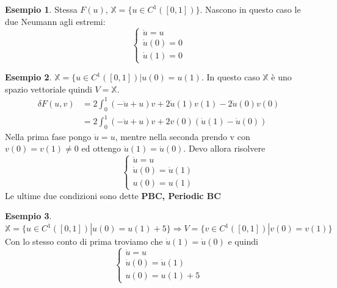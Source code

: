 \documentclass[a4paper]{book}
\theoremstyle{definition}
\newtheorem{ex}{Esempio}
\theoremstyle{remark}
\theoremstyle{definition}
\newcommand{\bbx}{\mathbb{X}}
\newcommand{\ra}{\Rightarrow}
\begin{document}
\begin{ex}
Stessa $F(u)$, $\bbx = \{ u \in C^1([0,1])\}$. Nascono in questo caso le due Neumann agli estremi:
\[
	\begin{cases}
	\ddot{u} = u\\
	\dot{u}(0) = 0\\
	\dot{u}(1) = 0
	\end{cases}
\]
\end{ex}	

\begin{ex}
$\bbx = \{u \in C^1([0,1])| u(0) = u(1)$. In questo caso $\bbx$ è uno spazio vettoriale quindi $V = \bbx$.
\begin{align}
\delta F(u,v) &= 2 \int_{0}^{1}(-\ddot{u}+u)v + 2\dot{u}(1)v(1) - 2\dot{u}(0)v(0)\\
& = 2 \int_{0}^{1}(-\ddot{u}+u)v + 2v(0)(\dot{u}(1) - \dot{u}(0))
\end{align}
Nella prima fase pongo $\ddot{u} = u$, mentre nella seconda prendo v con $v(0)=v(1)\not=0$ ed ottengo $\dot{u}(1)=\dot{u}(0)$.
Devo allora risolvere
\[
	\begin{cases}
	\ddot{u} = u\\
	\dot{u}(0) = \dot{u}(1)\\
	u(0) = u(1)
	\end{cases}
\]
Le ultime due condizioni sono dette \textbf{PBC, Periodic BC}
\end{ex}

\begin{ex}
$\bbx =\{u \in C^1([0,1])| u(0) = u(1) + 5\} \ra V =\{v \in C^1([0,1])| v(0) = v(1)\} $\\
Con lo stesso conto di prima troviamo che $\dot{u}(1) = \dot{u}(0)$ e quindi 
\[
	\begin{cases}
	\ddot{u} = u\\
	\dot{u}(0) = \dot{u}(1)\\
	u(0) = u(1) + 5
	\end{cases}
\]
\end{ex}
\end{document}
